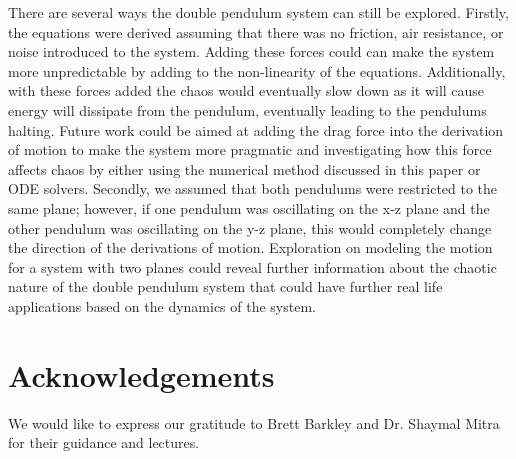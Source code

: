 \documentclass[linenumbers,RNAAS,trackchanges]{aastex631}
\begin{document}
There are several ways the double pendulum system can still be explored. Firstly, the equations were derived assuming that there was no friction, air resistance, or noise introduced to the system. Adding these forces could can make the system more unpredictable by adding to the non-linearity of the equations. Additionally, with these forces added the chaos would eventually slow down as it will cause energy will dissipate from the pendulum, eventually leading to the pendulums halting. Future work could be aimed at adding the drag force into the derivation of motion to make the system more pragmatic and investigating how this force affects chaos by either using the numerical method discussed in this paper or ODE solvers. Secondly, we assumed that both pendulums were restricted to the same plane; however, if one pendulum was oscillating on the x-z plane and the other pendulum was oscillating on the y-z plane, this would completely change the direction of the derivations of motion. Exploration on modeling the motion for a system with two planes could reveal further information about the chaotic nature of the double pendulum system that could have further real life applications based on the dynamics of the system.   


\newpage



\section{Acknowledgements} \label{sec:acknowledgements}
We would like to express our gratitude to Brett Barkley and Dr. Shaymal Mitra for their guidance and lectures. 
\end{document}
